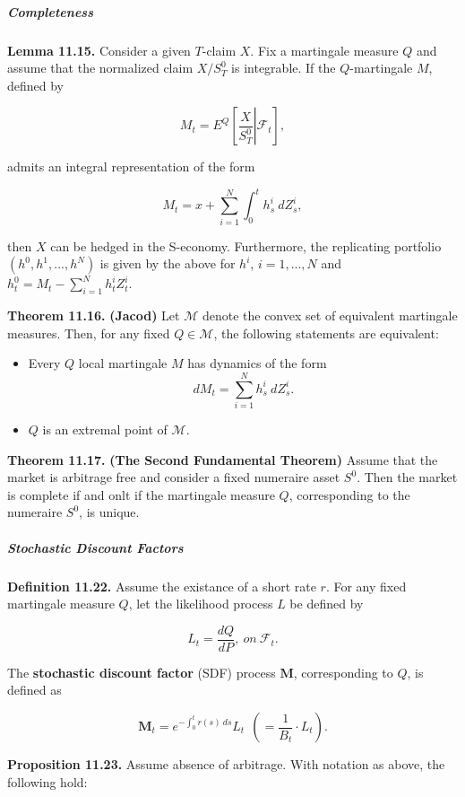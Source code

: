 \documentclass[
]{article}
\providecommand{\tightlist}{%
  \setlength{\itemsep}{0pt}\setlength{\parskip}{0pt}}
\begin{document}
\hypertarget{completeness-1}{%
\subparagraph{Completeness}\label{completeness-1}}

\textbf{Lemma 11.15.} Consider a given \(T\)-claim \(X\). Fix a
martingale measure \(Q\) and assume that the normalized claim
\(X/S^0_T\) is integrable. If the \(Q\)-martingale \(M\), defined by

\[
M_t=E^Q\left[\left. \frac{X}{S^0_T}\right\vert \mathcal{F}_t\right],
\]

admits an integral representation of the form

\[
M_t=x+\sum_{i=1}^N\int_0^th_s^i\ dZ_s^i,
\]

then \(X\) can be hedged in the S-economy. Furthermore, the replicating
portfolio \((h^0,h^1,...,h^N)\) is given by the above for \(h^i\),
\(i=1,...,N\) and \(h_t^0=M_t-\sum_{i=1}^Nh_t^iZ_t^i\).

\textbf{Theorem 11.16.} \textbf{(Jacod)} Let \(\mathcal{M}\) denote the
convex set of equivalent martingale measures. Then, for any fixed
\(Q\in\mathcal{M}\), the following statements are equivalent:

\begin{itemize}
\tightlist
\item
  Every \(Q\) local martingale \(M\) has dynamics of the form \[
    dM_t=\sum_{i=1}^Nh_s^i\ dZ_s^i.
    \]
\item
  \(Q\) is an extremal point of \(\mathcal{M}\).
\end{itemize}

\textbf{Theorem 11.17.} \textbf{(The Second Fundamental Theorem)} Assume
that the market is arbitrage free and consider a fixed numeraire asset
\(S^0\). Then the market is complete if and onlt if the martingale
measure \(Q\), corresponding to the numeraire \(S^0\), is unique.

\hypertarget{stochastic-discount-factors-1}{%
\subparagraph{Stochastic Discount
Factors}\label{stochastic-discount-factors-1}}

\textbf{Definition 11.22.} Assume the existance of a short rate \(r\).
For any fixed martingale measure \(Q\), let the likelihood process \(L\)
be defined by

\[
L_t=\frac{dQ}{dP},\ on\ \mathcal{F}_t.
\]

The \textbf{stochastic discount factor} (SDF) process \(\mathbf{M}\),
corresponding to \(Q\), is defined as

\[
\mathbf{M}_t=e^{-\int_0^tr(s)\ ds}L_t\ \ \left(=\frac{1}{B_t}\cdot L_t\right).
\]

\textbf{Proposition 11.23.} Assume absence of arbitrage. With notation
as above, the following hold:
\end{document}
